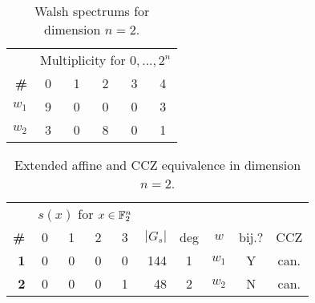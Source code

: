 \begin{table}[H]\centering
\begin{tabular}{>{\bfseries}rccccc}
\toprule
& \multicolumn{5}{c}{Multiplicity for $0, ..., 2^n$} \\
\cmidrule{2-6}
\# & 0 & 1 & 2 & 3 & 4 \\
\midrule
$w_1$ & 9 & 0 & 0 & 0 & 3 \\
$w_2$ & 3 & 0 & 8 & 0 & 1 \\
\bottomrule
\end{tabular}
\caption{Walsh spectrums for dimension $n=2$.}
\label{tab:walshdim2}
\end{table}

\begin{table}[H]\centering
\begin{tabular}{>{\bfseries}rccccrcccc}
\toprule
& \multicolumn{4}{c}{$s(x)$ for $x\in{\mathbb{F}}_2^n$} & \\
\cmidrule{2-5}
\# & 0 & 1 & 2 & 3 & $|G_s|$ & deg & $w$ & bij.? & CCZ \\
\midrule
1 & 0 & 0 & 0 & 0 & 144 & 1 & $w_1$ & Y & can. \\
2 & 0 & 0 & 0 & 1 & 48 & 2 & $w_2$ & N & can. \\
 \bottomrule
\end{tabular}
\caption{Extended affine and CCZ equivalence in dimension $n=2$.}
\label{tab:dim2}
\end{table}
